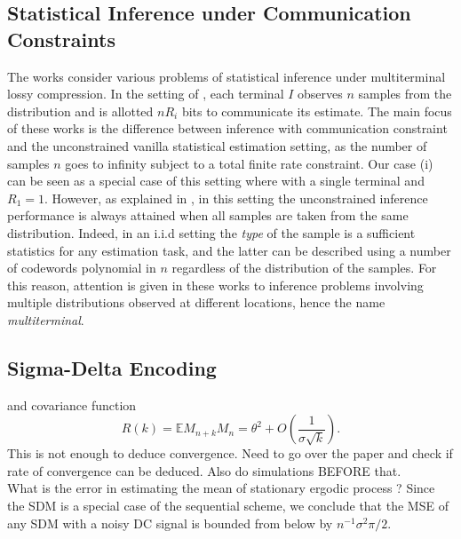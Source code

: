 \documentclass[letterpaper, conference, 11pt]{IEEEtran}      %
\begin{document}


\subsection{Statistical Inference under Communication Constraints}
The works \cite{han1987hypothesis, zhang1988estimation, 720540} consider various problems of statistical inference under multiterminal lossy compression. In the setting of \cite{han1987hypothesis, zhang1988estimation, 720540}, each terminal $I$ observes $n$ samples from the distribution and is allotted $nR_i$ bits to communicate its estimate.%
The main focus of these works is the difference between inference with communication constraint and the unconstrained vanilla statistical estimation setting, as the number of samples $n$ goes to infinity subject to a total finite rate constraint. Our case (i) can be seen as a special case of this setting where with a single terminal and $R_1 = 1$. However, as explained in \cite[Sec. III]{720540}, in this setting the unconstrained inference performance is always attained when all samples are taken from the same distribution. Indeed, in an i.i.d setting the \emph{type} of the sample \cite{csiszar1998method} is a sufficient statistics for any estimation task, and the latter can be described using a number of codewords polynomial in $n$ regardless of the distribution of the samples. For this reason, attention is given in these works to inference problems involving multiple distributions observed at different locations, hence the name \emph{multiterminal}. 

\subsection{Sigma-Delta Encoding}

and covariance function \cite[Eq. 25]{53738}
\[
R(k) = \mathbb E M_{n+k} M_n = \theta^2 + O \left( \frac{1}{\sigma \sqrt{ k} } \right). 
\]
{\color{red} This is not enough to deduce convergence. Need to go over the paper and check if rate of convergence can be deduced. Also do simulations BEFORE that. \\

What is the error in estimating the mean of stationary ergodic process ? 
}
Since the SDM is a special case of the sequential scheme, we conclude that the MSE of any SDM with a noisy DC signal is bounded from below by $n^{-1} \sigma^2 \pi/2 $.
\end{document}
